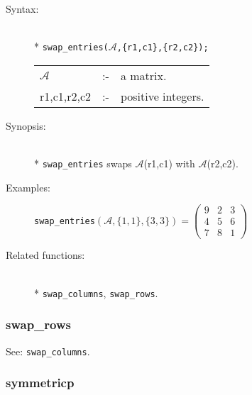 \begin{description}
\item[Syntax:]\mbox{}\\*
\texttt{swap\_entries($\mathcal{A}$,\{r1,c1\},\{r2,c2\});}\\[2mm]
\begin{tabular}{l l l}
$\mathcal{A}$  &:-& a matrix. \\
r1,c1,r2,c2 &:-& positive integers.
\end{tabular}

\item[Synopsis:]\mbox{}\\*
\texttt{swap\_entries} swaps $\mathcal{A}$(r1,c1) with
                $\mathcal{A}$(r2,c2).

\item[Examples:]
\begin{flushleft}
\texttt{swap\_entries}\((\mathcal{A},\{1,1\},\{3,3\}) =
        \begin{pmatrix} 9 & 2 & 3 \\ 4 & 5 & 6 \\ 7 & 8 & 1 \end{pmatrix}\)
\end{flushleft}

\item[Related functions:]\mbox{}\\*
\texttt{swap\_columns}, \texttt{swap\_rows}.
\end{description}


\subsubsection{swap\_rows}
\label{linalg:swap_rows}
\hypertarget{operator:SWAP_ROWS}{}
See: \texttt{swap\_columns}.


\subsubsection{symmetricp}
\label{linalg:symmetricp}
\hypertarget{operator:SYMMETRICP}{}

